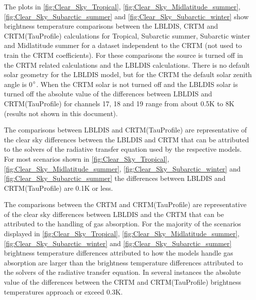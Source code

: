The plots in \ref{fig:Clear_Sky_Tropical}, \ref{fig:Clear_Sky_Midlatitude_summer}, \ref{fig:Clear_Sky_Subarctic_summer} and \ref{fig:Clear_Sky_Subarctic_winter} show brightness temperature comparisons between the LBLDIS, CRTM and CRTM(TauProfile) calculations for Tropical, Subarctic summer, Subarctic winter and Midlatitude summer for a dataset independent to the CRTM (not used to train the CRTM coefficients). For these comparisons the source is turned off in the CRTM related calculations and the LBLDIS calculations. There is no default solar geometry for the LBLDIS model, but for the CRTM the default solar zenith angle is 0$^\circ$. When the CRTM solar is not turned off and the LBLDIS solar is turned off the absolute value of the differences between LBLDIS and CRTM(TauProfile) for channels 17, 18 and 19 range from about 0.5K to 8K (results not shown in this document). 

The comparisons between LBLDIS and CRTM(TauProfile) are representative of the clear sky differences between the LBLDIS and CRTM that can be attributed to the solvers of the radiative transfer equation used by the respective models. For most scenarios shown in \ref{fig:Clear_Sky_Tropical}, \ref{fig:Clear_Sky_Midlatitude_summer}, \ref{fig:Clear_Sky_Subarctic_winter} and \ref{fig:Clear_Sky_Subarctic_summer} the differences between LBLDIS and CRTM(TauProfile) are 0.1K or less. 

The comparisons between the CRTM and CRTM(TauProfile) are representative of the clear sky differences between LBLDIS and the CRTM that can be attributed to the handling of gas absorption. For the majority of the scenarios displayed in \ref{fig:Clear_Sky_Tropical}, \ref{fig:Clear_Sky_Midlatitude_summer}, \ref{fig:Clear_Sky_Subarctic_winter} and \ref{fig:Clear_Sky_Subarctic_summer} brightness temperature differences attributed to how the models handle gas absorption are larger than the brightness temperature differences attributed to the solvers of the radiative transfer equation. In several instances the absolute value of the differences between the CRTM and CRTM(TauProfile) brightness temperatures approach or exceed 0.3K.

